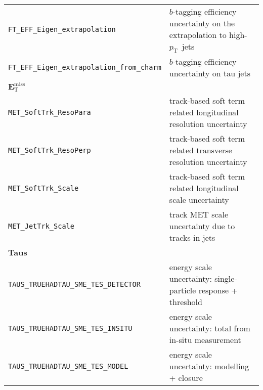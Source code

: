 {\begin{xltabular}{\textwidth}{XX}
  \texttt{FT\_EFF\_Eigen\_extrapolation} & $b$-tagging efficiency uncertainty on the extrapolation to high-$p_{\mathrm{T}}$\ jets \\
  \texttt{FT\_EFF\_Eigen\_extrapolation\_from\_charm} & $b$-tagging efficiency uncertainty on tau jets \\
  {\bfseries $\bm{E}_{\mathrm{T}}^{\text{miss}}$}&\\
  \texttt{MET\_SoftTrk\_ResoPara} & track-based soft term related longitudinal resolution uncertainty \\
  \texttt{MET\_SoftTrk\_ResoPerp} &  track-based soft term related transverse resolution uncertainty \\
  \texttt{MET\_SoftTrk\_Scale} & track-based soft term related longitudinal scale uncertainty \\
  \texttt{MET\_JetTrk\_Scale} & track MET scale uncertainty due to tracks in jets \\
  {\bfseries Taus}&\\
  \texttt{TAUS\_TRUEHADTAU\_SME\_TES\_DETECTOR} & energy scale uncertainty: single-particle response + threshold \\
  \texttt{TAUS\_TRUEHADTAU\_SME\_TES\_INSITU} & energy scale uncertainty: total from in-situ measurement \\
  \texttt{TAUS\_TRUEHADTAU\_SME\_TES\_MODEL} & energy scale uncertainty: modelling + closure \\
\end{xltabular}}